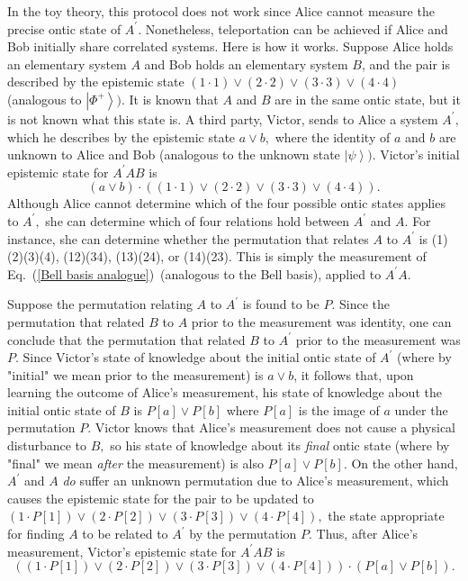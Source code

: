 \documentclass[pra,nofootinbib,showpacs,12pt]{revtex4}
\begin{document}
In the toy theory, this protocol does not work since Alice cannot measure
the precise ontic state of $A^{\prime }$. Nonetheless, teleportation can be
achieved if Alice and Bob initially share correlated systems. Here is how it
works. Suppose Alice holds an elementary system $A$ and Bob holds an
elementary system $B$, and the pair is described by the epistemic state $%
(1\cdot 1)\vee (2\cdot 2)\vee (3\cdot 3)\vee (4\cdot 4)$ (analogous to $%
\left| \Phi ^{+}\right\rangle ).$ It is known that $A$ and $B$ are in the
same ontic state, but it is not known what this state is. A third party,
Victor, sends to Alice a system $A^{\prime },$ which he describes by the
epistemic state $a\vee b,$ where the identity of $a$ and $b$ are unknown to
Alice and Bob (analogous to the unknown state $\left| \psi \right\rangle )$.
Victor's initial epistemic state for $A^{\prime }AB$ is
\begin{equation}
(a\vee b)\cdot \left( (1\cdot 1)\vee (2\cdot 2)\vee (3\cdot 3)\vee (4\cdot
4)\right) .
\end{equation}
Although Alice cannot determine which of the four possible ontic states
applies to $A^{\prime },$ she can determine which of four relations hold
between $A^{\prime }$ and $A.$ For instance, she can determine whether the
permutation that relates $A$ to $A^{\prime }$ is (1)(2)(3)(4), (12)(34),
(13)(24), or (14)(23). This is simply the measurement of Eq.~(\ref{Bell
basis analogue})~(analogous to the Bell basis), applied to $A^{\prime }A.$

Suppose the permutation relating $A$ to $A^{\prime }$ is found to be $P.$
Since the permutation that related $B$ to $A$ prior to the measurement was
identity, one can conclude that the permutation that related $B$ to $%
A^{\prime }$ prior to the measurement was $P.$ Since Victor's state of
knowledge about the initial ontic state of $A^{\prime }$ (where by "initial"
we mean prior to the measurement) is $a\vee b$, it follows that, upon
learning the outcome of Alice's measurement, his state of knowledge about
the initial ontic state of $B$ is $P[a]\vee P[b]$ where $P[a]$ is the image
of $a$ under the permutation $P.$ Victor knows that Alice's measurement does
not cause a physical disturbance to $B,$ so his state of knowledge about its
\emph{final} ontic state (where by "final" we mean \emph{after }the
measurement) is also $P[a]\vee P[b].$ On the other hand, $A^{\prime }$ and $A
$ \emph{do} suffer an unknown permutation due to Alice's measurement, which
causes the epistemic state for the pair to be updated to $(1\cdot P[1])\vee
(2\cdot P[2])\vee (3\cdot P[3])\vee (4\cdot P[4]),$ the state appropriate
for finding $A$ to be related to $A^{\prime }$ by the permutation $P.$ Thus,
after Alice's measurement, Victor's epistemic state for $A^{\prime }AB$ is
\begin{equation*}
((1\cdot P[1])\vee (2\cdot P[2])\vee (3\cdot P[3])\vee (4\cdot P[4]))\cdot
(P[a]\vee P[b]).
\end{equation*}
\end{document}
